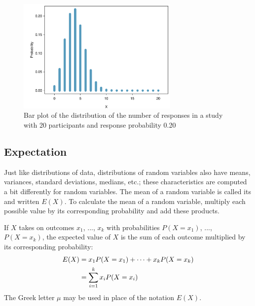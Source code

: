 \begin{figure}[h]
	\centering
	\includegraphics[width=0.70\textwidth]
	{ch_distributions_oi_biostat/figures/distRespClinStudy/distRespClinStudy.pdf}
	\caption{Bar plot of the distribution of the number of responses in a study with 20 participants and response probability 0.20}
	\label{distRespClinStudy}
\end{figure}

\subsection{Expectation}


Just like distributions of data, distributions of random variables also have means, variances, standard deviations, medians, etc.; these characteristics are computed a bit differently for random variables. The mean of a random variable is called its  and written $E(X)$. To calculate the mean of a random variable, multiply each possible value by its corresponding probability and add these products.

\begin{termBox}{
		If $X$ takes on outcomes $x_1$, ..., $x_k$ with probabilities $P(X=x_1)$, ..., $P(X=x_k)$, the expected value of $X$ is the sum of each outcome multiplied by its corresponding probability:
		\begin{align}
		E(X) 	&= x_1 P(X=x_1) + \cdots + x_k P(X=x_k) \notag \\
		&= \sum_{i=1}^{k}x_iP(X=x_i)
		\end{align}
		The Greek letter $\mu$ may be used in place of the notation $E(X)$.}
\end{termBox}

